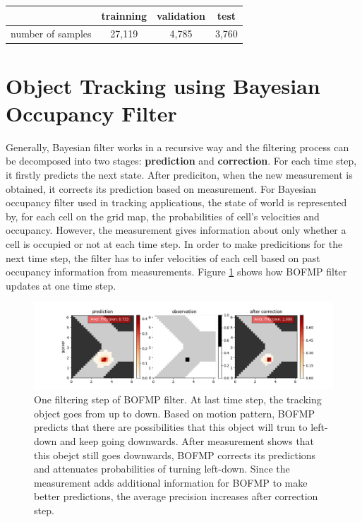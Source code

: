 \begin{center}
  \begin{tabular}{c|ccc}
    \hline
     & trainning & validation & test \\ \hline
    number of samples & 27,119 & 4,785 & 3,760\\
    \hline
  \end{tabular}
\end{center}

\section{Object Tracking using Bayesian Occupancy Filter}

Generally, Bayesian filter works in a recursive way and the filtering process can be decomposed into two stages: \textbf{prediction} and \textbf{correction}. For each time step, it firstly predicts the next state. After prediciton, when the new measurement is obtained, it corrects its prediction based on measurement. For Bayesian occupancy filter used in tracking applications, the state of world is represented by, for each cell on the grid map, the probabilities of cell's velocities and occupancy. However, the measurement gives information about only whether a cell is occupied or not at each time step. In order to make predicitions for the next time step, the filter has to infer velocities of each cell based on past occupancy information from measurements. Figure \ref{fig:correction} shows how BOFMP filter updates at one time step.


\begin{figure}[ht]
  \centering
    \includegraphics[width=\textwidth]{figures/correction_step.png}
    \caption{One filtering step of BOFMP filter. At last time step, the tracking object goes from up to down. Based on motion pattern, BOFMP predicts that there are possibilities that this object will trun to left-down and keep going downwards. After measurement shows that this obejct still goes downwards, BOFMP corrects its predictions and attenuates probabilities of turning left-down. Since the measurement adds additional information for BOFMP to make better predictions, the average precision increases after correction step.}
    \label{fig:correction}
\end{figure}

